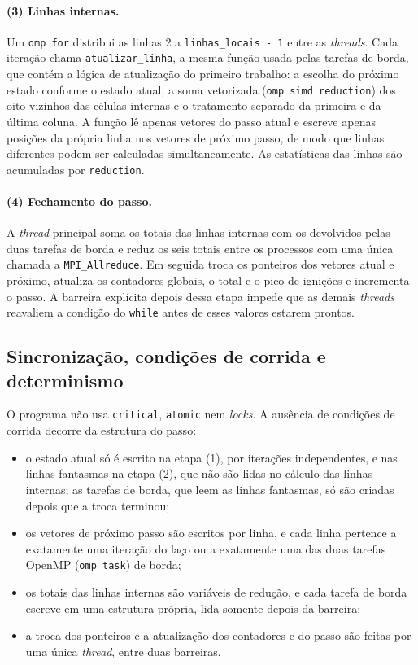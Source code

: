 \documentclass[11pt,a4paper]{article}
\begin{document}
\paragraph{(3) Linhas internas.} Um \texttt{omp for} distribui as linhas 2 a \texttt{linhas\_locais - 1} entre as \emph{threads}. Cada iteração chama \texttt{atualizar\_linha}, a mesma função usada pelas tarefas de borda, que contém a lógica de atualização do primeiro trabalho: a escolha do próximo estado conforme o estado atual, a soma vetorizada (\texttt{omp simd reduction}) dos oito vizinhos das células internas e o tratamento separado da primeira e da última coluna. A função lê apenas vetores do passo atual e escreve apenas posições da própria linha nos vetores de próximo passo, de modo que linhas diferentes podem ser calculadas simultaneamente. As estatísticas das linhas são acumuladas por \texttt{reduction}.

\paragraph{(4) Fechamento do passo.} A \emph{thread} principal soma os totais das linhas internas com os devolvidos pelas duas tarefas de borda e reduz os seis totais entre os processos com uma única chamada a \texttt{MPI\_Allreduce}. Em seguida troca os ponteiros dos vetores atual e próximo, atualiza os contadores globais, o total e o pico de ignições e incrementa o passo. A barreira explícita depois dessa etapa impede que as demais \emph{threads} reavaliem a condição do \texttt{while} antes de esses valores estarem prontos.

\subsection{Sincronização, condições de corrida e determinismo}
\label{sec:sincronizacao}

O programa não usa \texttt{critical}, \texttt{atomic} nem \emph{locks}. A ausência de condições de corrida decorre da estrutura do passo:

\begin{itemize}
    \item o estado atual só é escrito na etapa (1), por iterações independentes, e nas linhas fantasmas na etapa (2), que não são lidas no cálculo das linhas internas; as tarefas de borda, que leem as linhas fantasmas, só são criadas depois que a troca terminou;
    \item os vetores de próximo passo são escritos por linha, e cada linha pertence a exatamente uma iteração do laço ou a exatamente uma das duas tarefas OpenMP (\texttt{omp task}) de borda;
    \item os totais das linhas internas são variáveis de redução, e cada tarefa de borda escreve em uma estrutura própria, lida somente depois da barreira;
    \item a troca dos ponteiros e a atualização dos contadores e do passo são feitas por uma única \emph{thread}, entre duas barreiras.
\end{itemize}
\end{document}
